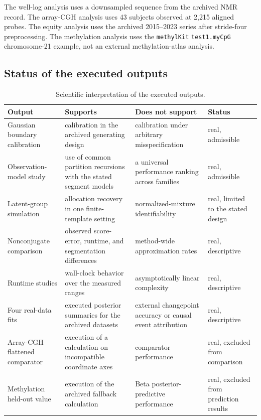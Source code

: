 The well-log analysis uses a downsampled sequence from the archived NMR record. The array-CGH analysis uses 43 subjects observed at 2,215 aligned probes. The equity analysis uses the archived 2015--2023 series after stride-four preprocessing. The methylation analysis uses the \texttt{methylKit} \texttt{test1.myCpG} chromosome-21 example, not an external methylation-atlas analysis.

\subsection{Status of the executed outputs}
\begin{table}[t]
\centering
\small
\caption{Scientific interpretation of the executed outputs.}
\label{tab:evidence-interpretation}
\begin{tabularx}{0.96\textwidth}{@{}L{0.22\textwidth}L{0.22\textwidth}Y L{0.19\textwidth}@{}}
\toprule
Output & Supports & Does not support & Status \\
\midrule
Gaussian boundary calibration & calibration in the archived generating design & calibration under arbitrary misspecification & real, admissible \\
Observation-model study & use of common partition recursions with the stated segment models & a universal performance ranking across families & real, admissible \\
Latent-group simulation & allocation recovery in one finite-template setting & normalized-mixture identifiability & real, limited to the stated design \\
Nonconjugate comparison & observed score-error, runtime, and segmentation differences & method-wide approximation rates & real, descriptive \\
Runtime studies & wall-clock behavior over the measured ranges & asymptotically linear complexity & real, descriptive \\
Four real-data fits & executed posterior summaries for the archived datasets & external changepoint accuracy or causal event attribution & real, descriptive \\
Array-CGH flattened comparator & execution of a calculation on incompatible coordinate axes & comparator performance & real, excluded from comparison \\
Methylation held-out value & execution of the archived fallback calculation & Beta posterior-predictive performance & real, excluded from prediction results \\
\bottomrule
\end{tabularx}
\end{table}

